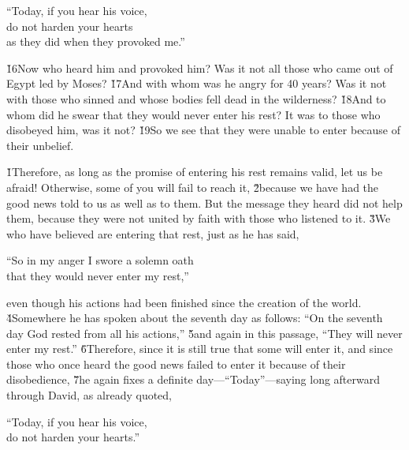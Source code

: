 \begin{poetry}
\poeml ``Today, if you hear his voice, \\
\poemll    do not harden your hearts \\
\poemlll       as they did when they provoked me.''
\end{poetry}

\v{16}Now who heard him and provoked him? Was it not all those who came out of Egypt led by Moses? \v{17}And with whom was he angry for 40 years? Was it not with those who sinned and whose bodies fell dead in the wilderness? \v{18}And to whom did he swear that they would never enter his rest? It was to those who disobeyed him, was it not? \v{19}So we see that they were unable to enter because of their unbelief.

\v{1}Therefore, as long as the promise of entering his rest remains valid, let us be afraid! Otherwise, some of you will fail to reach it, \v{2}because we have had the good news told to us as well as to them. But the message they heard did not help them, because they were not united by faith with those who listened to it. \v{3}We who have believed are entering that rest, just as he has said,

\begin{poetry}
\poeml ``So in my anger I swore a solemn oath \\
\poemll    that they would never enter my rest,''
\end{poetry}

even though his actions had been finished since the creation of the world. \v{4}Somewhere he has spoken about the seventh day as follows: ``On the seventh day God rested from all his actions,'' \v{5}and again in this passage, ``They will never enter my rest.'' \v{6}Therefore, since it is still true that some will enter it, and since those who once heard the good news failed to enter it because of their disobedience, \v{7}he again fixes a definite day---``Today''---saying long afterward through David, as already quoted,

\begin{poetry}
\poeml ``Today, if you hear his voice, \\
\poemll    do not harden your hearts.''
\end{poetry}

